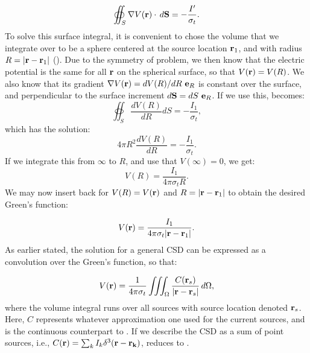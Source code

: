 \begin{equation}
\oiint_{S} \nabla V({\bf r}) \cdot \, d{\bf S}  = - \frac{I'}{\sigma_t}.
\label{eq:VC:berit1}
\end{equation}
To solve this surface integral, it is convenient to chose the volume that we integrate over 
to be a sphere centered at the source location ${\bf r}_1$, 
and with radius $R = |{\bf r}-{\bf r}_1|$ (). 
Due to the symmetry of problem, we then know that the electric potential 
is the same for all ${\bf r}$ on the spherical surface, so that $V({\bf r}) = V(R)$. 
We also know that its gradient $\nabla V({\bf r}) = d V(R)/dR ~{\bf e}_R$ is constant over the surface, 
and perpendicular to the surface increment $d{\bf S} = dS {~\bf e}_R$. 
If we use this,  becomes:
\begin{equation}
\oiint_{S} \frac{d V(R)}{dR} d{S}  = - \frac{I_1}{\sigma_t},
\label{eq:VC:berit1ogenhalv}
\end{equation}
which has the solution:
\begin{equation}
4\pi R^2 \frac{d V(R)}{dR} = -\frac{I_1}{\sigma_t}.
\label{eq:VC:berit2}
\end{equation}
If we integrate this from $\infty$ to $R$, and use that $V(\infty) = 0$, we get:
\begin{equation}
V(R) =  \frac{I_1}{4\pi \sigma_t R}.
\label{eq:VC:berit3}
\end{equation}
We may now insert back for $V(R)= V({\bf r})$ and $R = |{\bf r}-{\bf r}_1|$ to obtain the desired Green's function:

\begin{equation}
V({\bf r})= \frac{I_1}{4\pi \sigma_t |{\bf r}-{\bf r}_1|}.
\label{eq:VC:berit4}
\end{equation}
As earlier stated, the solution for a general CSD can be expressed as a convolution over the Green's function, so that:

\begin{equation}
V({\bf r}) = \frac{1}{4\pi \sigma_t}\iiint_{\Omega} \frac{C({\bf r}_s)}{|{\bf r}-{\bf r}_s|} \,d\Omega,
\label{eq:VC:csds}
\end{equation}
where the volume integral runs over all sources with source location denoted ${\bf r}_s$. 
Here, $C$ represents whatever approximation one used for the current sources, 
and  is the continuous counterpart to . 
If we describe the CSD as a sum of point sources, i.e.,  
$C({\bf r}) = \sum_k I_k \delta^3({\bf r} - {\bf r_k})$,  
 reduces to .


